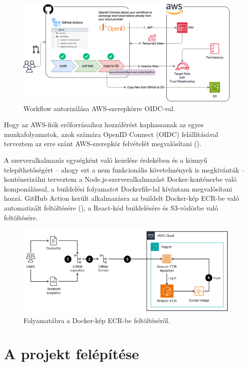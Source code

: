 \begin{figure}[h]
	\centering
	\includegraphics[width=150mm, keepaspectratio]{figures/githuboidc.png}
	\caption{Workflow autorizálása AWS-szerepkörre OIDC-val.}
	\label{fig:githuboidc}
\end{figure}

Hogy az AWS-fiók erőforrásaihoz hozzáférést kaphassanak az egyes munkafolyamatok, azok számára OpenID Connect (OIDC) felállításával terveztem az erre szánt AWS-szerepkör felvételét megvalósítani ().\cite{githuboidc}

A szerveralkalmazás egységként való kezelése érdekében és a könnyű telepíthetőségért -- ahogy ezt a nem funkcionális követelmények is megkívánták -- konténerizálni terveztem a Node.js-szerveralkalmazást Docker-konténerbe való komponálással, a buildelési folyamatot Dockerfile-lal kívántam megvalósítani hozzá. GitHub Action került alkalmazásra az buildelt Docker-kép ECR-be való automatizált feltöltésére (), a React-kód buildelésére és S3-vödörbe való feltöltésére.

\begin{figure}
	\centering
	\includegraphics[width=150mm, keepaspectratio]{figures/ecr.png}
	\caption{Folyamatábra a Docker-kép ECR-be feltöltéséről.}
	\label{fig:ecr}
\end{figure}

\section{A projekt felépítése}

